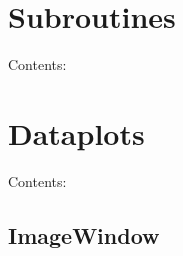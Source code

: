 \documentclass[letterpaper,10pt,english]{sphinxmanual}
\begin{document}
\section{Subroutines}
\label{Subroutines::doc}\label{Subroutines:subroutines}
Contents:


\section{Dataplots}
\label{Dataplots::doc}\label{Dataplots:dataplots}
Contents:


\subsection{ImageWindow}
\label{ImageWindow::doc}\label{ImageWindow:imagewindow}
\end{document}

